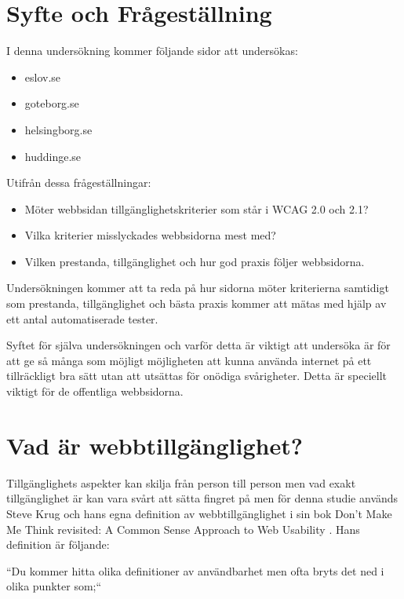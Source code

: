 \documentclass[11p]{article}
\begin{document}
    \section{Syfte och Frågeställning}
    I denna undersökning kommer följande sidor att undersökas:

    \begin{itemize}
        \item eslov.se
        \item goteborg.se
        \item helsingborg.se
        \item huddinge.se
    \end{itemize}

    Utifrån dessa frågeställningar:

    \begin{itemize}
        \item Möter webbsidan tillgänglighetskriterier som står i WCAG 2.0 och 2.1?
        \item Vilka kriterier misslyckades webbsidorna mest med?
        \item Vilken prestanda, tillgänglighet och hur god praxis följer webbsidorna.
    \end{itemize}

    Undersökningen kommer att ta reda på hur sidorna möter kriterierna samtidigt som prestanda, tillgänglighet och bästa praxis kommer att mätas med hjälp av ett antal automatiserade tester.

    Syftet för själva undersökningen och varför detta är viktigt att undersöka är för att ge så många som möjligt möjligheten att kunna använda internet på ett tillräckligt bra sätt utan att utsättas för onödiga svårigheter.
    Detta är speciellt viktigt för de offentliga webbsidorna.

    \section{Vad är webbtillgänglighet?}
    Tillgänglighets aspekter kan skilja från person till person men vad exakt tillgänglighet är kan vara svårt att sätta fingret på men för denna studie används Steve Krug och hans egna definition av webbtillgänglighet i sin bok Don't Make Me Think revisited: A Common Sense Approach to Web Usability \textcite{Krug}.
    Hans definition är följande:


    ``Du kommer hitta olika definitioner av användbarhet men ofta bryts det ned i olika punkter som;``
\end{document}
